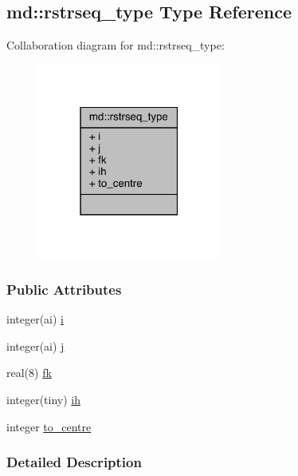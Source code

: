 \hypertarget{structmd_1_1rstrseq__type}{\subsection{md\-:\-:rstrseq\-\_\-type Type Reference}
\label{structmd_1_1rstrseq__type}
}


Collaboration diagram for md\-:\-:rstrseq\-\_\-type\-:
\nopagebreak
\begin{figure}[H]
\begin{center}
\leavevmode
\includegraphics[width=171pt]{structmd_1_1rstrseq__type__coll__graph}
\end{center}
\end{figure}
\subsubsection*{Public Attributes}
\begin{DoxyCompactItemize}
\item 
integer(ai) \hyperlink{structmd_1_1rstrseq__type_a65073d530d03fc7fcc43c4a9db6734a7}{i}
\item 
integer(ai) \hyperlink{structmd_1_1rstrseq__type_a882d442463cff61992451257fd294604}{j}
\item 
real(8) \hyperlink{structmd_1_1rstrseq__type_acbcd729f04b4e0aaa3ee41ff82fedda4}{fk}
\item 
integer(tiny) \hyperlink{structmd_1_1rstrseq__type_a7ca060dd7802b6a03c75994c0d0cc11f}{ih}
\item 
integer \hyperlink{structmd_1_1rstrseq__type_a052efb643f6af6c4b17d9ec194108e03}{to\-\_\-centre}
\end{DoxyCompactItemize}


\subsubsection{Detailed Description}


